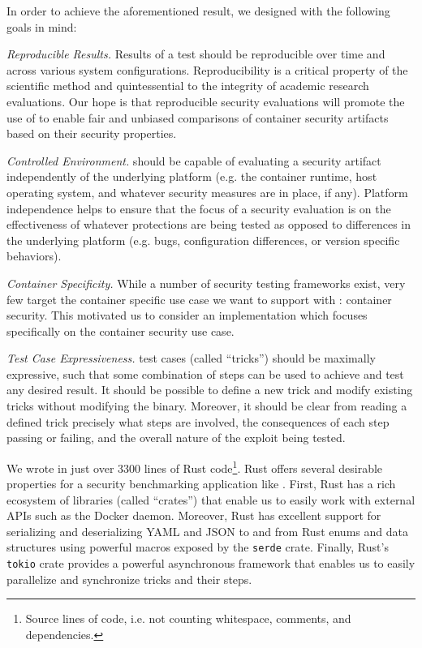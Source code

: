 In order to achieve the aforementioned result, we designed \houdini with the following
goals in mind:
\begin{dgenum}
  \item \label{dg:repro}\textit{Reproducible Results.} Results of a test should be
  reproducible over time and across various system configurations. Reproducibility is
  a critical property of the scientific method and quintessential to the integrity of
  academic research evaluations. Our hope is that reproducible security evaluations will
  promote the use of \houdini to enable fair and unbiased comparisons of container security
  artifacts based on their security properties.

  \item \label{dg:platform}\textit{Controlled Environment.} \houdini should be capable of
  evaluating a security artifact independently of the underlying platform (e.g\@. the
  container runtime, host operating system, and whatever security measures are in place,
  if any). Platform independence helps to ensure that the focus of a security evaluation
  is on the effectiveness of whatever protections are being tested as opposed to
  differences in the underlying platform (e.g\@. bugs, configuration differences, or
  version specific behaviors).

  \item \label{dg:container}\textit{Container Specificity.} While a number of security
  testing frameworks exist, very few target the container specific use case we want to
  support with \houdini: container security. This motivated us to consider an
  implementation which focuses specifically on the container security use case.

  \item \label{dg:flex}\textit{Test Case Expressiveness.} \houdini test cases (called
  \enquote{tricks}) should be maximally expressive, such that some combination of steps
  can be used to achieve and test any desired result. It should be possible to define
  a new \houdini trick and modify existing tricks without modifying the \houdini
  binary. Moreover, it should be clear from reading a defined trick precisely what steps
  are involved, the consequences of each step passing or failing, and the overall nature
  of the exploit being tested.
\end{dgenum}

We wrote \houdini in just over 3300 lines of Rust code\footnote{Source lines of code,
i.e\@. not counting whitespace, comments, and dependencies.}. Rust offers several
desirable properties for a security benchmarking application like \houdini. First, Rust
has a rich ecosystem of libraries (called \enquote{crates}) that enable us to easily work
with external APIs such as the Docker daemon. Moreover, Rust has excellent support for
serializing and deserializing YAML and JSON to and from Rust enums and data structures using
powerful macros exposed by the \texttt{serde} crate. Finally, Rust's \texttt{tokio} crate
provides a powerful asynchronous framework that enables us to easily parallelize and
synchronize \houdini tricks and their steps.

